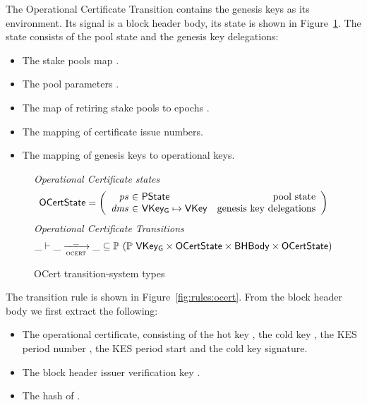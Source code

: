 The Operational Certificate Transition contains the genesis keys as its environment.
Its signal is a block header body, its state is shown in
Figure~\ref{fig:ts-types:ocert}. The state consists of the pool state and the genesis
key delegations:

\begin{itemize}
\item The stake pools map .
\item The pool parameters .
\item The map of retiring stake pools to epochs .
\item The mapping  of certificate issue numbers.
\item The mapping of genesis keys to operational keys.
\end{itemize}

\begin{figure}
  \emph{Operational Certificate states}
  \begin{equation*}
    \OCertState =
    \left(
      \begin{array}{r@{~\in~}lr}
        \var{ps} & \PState & \text{pool state} \\
        \var{dms} & \VKeyGen\mapsto\VKey & \text{genesis key delegations} \\
      \end{array}
    \right)
  \end{equation*}
  \emph{Operational Certificate Transitions}
  \begin{equation*}
    \_ \vdash \var{\_} \trans{ocert}{\_} \var{\_} \subseteq
    \powerset (\powerset{\VKeyGen} \times \OCertState \times \BHBody \times \OCertState)
  \end{equation*}
  \caption{OCert transition-system types}
  \label{fig:ts-types:ocert}
\end{figure}

The transition rule is shown in Figure~\ref{fig:rules:ocert}. From the block
header body  we first extract the following:

\begin{itemize}
  \item The operational certificate, consisting of the hot key , the cold key
    , the KES period number , the KES period start  and the cold key
  signature.
\item The block header issuer verification key .
\item The hash  of .
\end{itemize}


